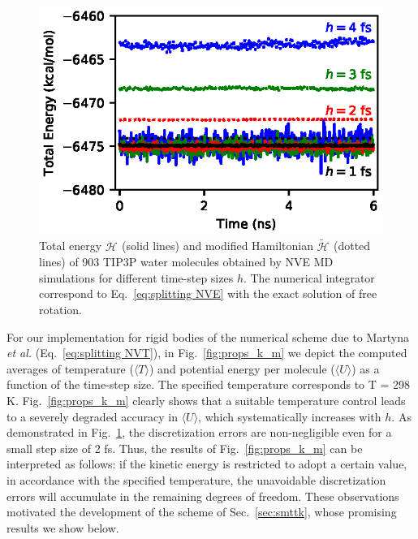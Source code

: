 \documentclass[
journal=jctcce,
layout=twocolumn
]{achemso}
\newcommand{\Ham}[1]{{\mathcal H}_\text{#1}}    %
\newcommand{\timestep}{h}
\newcommand{\modified}[1]{\widetilde{#1}}
\begin{document}
\begin{figure}
	\includegraphics{Figures/NVE.eps}
	\caption{Total energy $\Ham{}$ (solid lines) and modified Hamiltonian $\modified{\Ham{}}$ (dotted lines) of 903 TIP3P\cite{Jorgensen_1983} water molecules obtained by NVE MD simulations for different time-step sizes $\timestep$. The numerical integrator correspond to Eq.~\ref{eq:splitting NVE} with the exact solution of free rotation.}
	\label{fig:nve}
\end{figure}

For our implementation for rigid bodies of the numerical scheme due to Martyna \textit{et al.} \cite{Martyna_1996} (Eq.~\ref{eq:splitting NVT}), in Fig.~\ref{fig:props_k_m} we depict the computed averages of temperature ($\langle T \rangle$) and potential energy per molecule ($\langle U \rangle$) as a function of the time-step size. 
The specified temperature corresponds to T = 298 K.
Fig.~\ref{fig:props_k_m} clearly shows that a suitable temperature control leads to a severely degraded accuracy in $\langle U \rangle$, which systematically increases with $\timestep$.
As demonstrated in Fig.~\ref{fig:nve}, the discretization errors are non-negligible even for a small step size of 2 fs.
Thus, the results of Fig.~\ref{fig:props_k_m} can be interpreted as follows: if the kinetic energy is restricted to adopt a certain value, in accordance with the specified temperature, the unavoidable discretization errors will accumulate in the remaining degrees of freedom.
These observations motivated the development of the scheme of Sec.~\ref{sec:smttk}, whose promising results we show below.
\end{document}
